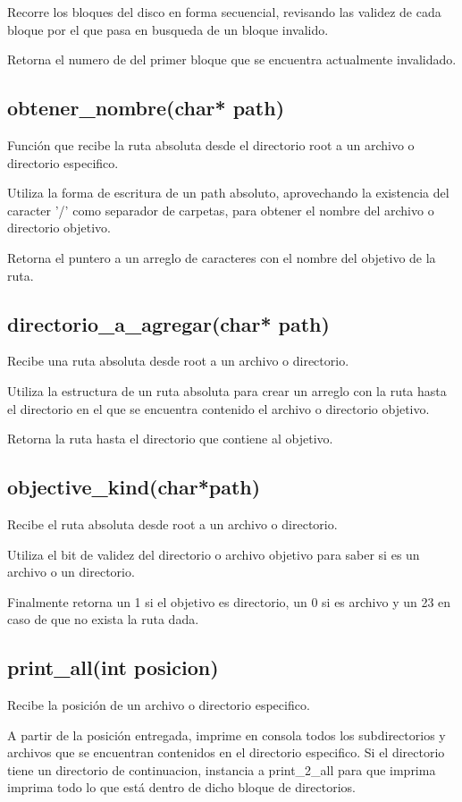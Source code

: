 \documentclass[12pt]{article}
\begin{document}
Recorre los bloques del disco en forma secuencial, revisando las validez de cada bloque por el que pasa en busqueda de un bloque invalido.

Retorna el numero de del primer bloque que se encuentra actualmente invalidado.

\subsection{obtener\_nombre(char* path)}
Función que recibe la ruta absoluta desde el directorio root a un archivo o directorio especifico.

Utiliza la forma de escritura de un path absoluto, aprovechando la existencia del caracter '/' como separador de carpetas, para obtener el nombre del archivo o directorio objetivo.

Retorna el puntero a un arreglo de caracteres con el nombre del objetivo de la ruta.

\subsection{directorio\_a\_agregar(char* path)}
Recibe una ruta absoluta desde root a un archivo o directorio.

Utiliza la estructura de un ruta absoluta para crear un arreglo con la ruta hasta el directorio en el que se encuentra contenido el archivo o directorio objetivo.

Retorna la ruta hasta el directorio que contiene al objetivo.

\subsection{objective\_kind(char*path)}
Recibe el ruta absoluta desde root a un archivo o directorio.

Utiliza el bit de validez del directorio o archivo objetivo para saber si es un archivo o un directorio.

Finalmente retorna un 1 si el objetivo es directorio, un 0 si es archivo y un 23 en caso de que no exista la ruta dada.

\subsection{print\_all(int posicion)}
Recibe la posición de un archivo o directorio especifico.

A partir de la posición entregada, imprime en consola todos los subdirectorios y archivos que se encuentran contenidos en el directorio especifico. Si el directorio tiene un directorio de continuacion, instancia a print\_2\_all para que imprima imprima todo lo que está dentro de dicho bloque de directorios.
\end{document}
